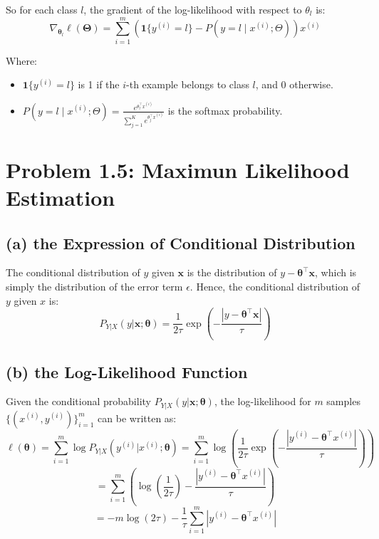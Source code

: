 \documentclass[12pt]{article}
\begin{document}
So for each class \(l\), the gradient of the log-likelihood with respect to \(\theta_l\) is:
\[
    \nabla_{\boldsymbol\theta_l}\ell(\boldsymbol{\Theta}) = \sum_{i=1}^m \left( \mathbf{1}\{ y^{(i)} = l \} - P(y = l \mid x^{(i)}; \Theta) \right) x^{(i)}
\]

Where:
\begin{itemize}
    \item \( \mathbf{1}\{ y^{(i)} = l \} \) is 1 if the \( i \)-th example belongs to class \( l \), and 0 otherwise.
    \item \( P(y = l \mid x^{(i)}; \Theta) = \frac{e^{\theta_l^\top x^{(i)}}}{\sum_{j=1}^K e^{\theta_j^\top x^{(i)}}} \) is the softmax probability.
\end{itemize}

\newpage

\section*{Problem 1.5: Maximun Likelihood Estimation}

\subsection*{(a) the Expression of Conditional Distribution}

The conditional distribution of \( y \) given \(\boldsymbol x \) is the distribution of \( y - \boldsymbol\theta^\top \boldsymbol x \), which is simply the distribution of the error term \( \epsilon \). Hence, the conditional distribution of \( y \) given \( x \) is:
\[
    P_{Y|X}(y|\boldsymbol x; \boldsymbol\theta) = \frac{1}{2\tau} \exp\left( -\frac{|y - \boldsymbol\theta^\top \boldsymbol x|}{\tau} \right)
\]

\subsection*{(b) the Log-Likelihood Function}

Given the conditional probability \( P_{Y|X}(y|\boldsymbol x; \boldsymbol\theta) \), 
the log-likelihood for \( m \) samples \( \{(x^{(i)}, y^{(i)})\}_{i=1}^m \) can be written as:
\[
    \ell(\boldsymbol\theta) = \sum_{i=1}^m \log P_{Y|X}(y^{(i)} | x^{(i)}; \boldsymbol\theta) =  \sum_{i=1}^m \log \left( \frac{1}{2\tau} \exp\left( -\frac{|y^{(i)} - \boldsymbol\theta^\top x^{(i)}|}{\tau} \right) \right)
\]
\[
    =  \sum_{i=1}^m \left( \log \left( \frac{1}{2\tau} \right) - \frac{|y^{(i)} - \boldsymbol\theta^\top x^{(i)}|}{\tau} \right) 
\]
\[
    =  -m \log(2\tau) - \frac{1}{\tau} \sum_{i=1}^m |y^{(i)} - \boldsymbol\theta^\top x^{(i)}|
\]
\end{document}
